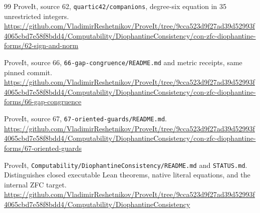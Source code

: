 \documentclass[11pt,a4paper]{article}
\theoremstyle{definition}
\newcommand{\src}[1]{{\urlstyle{tt}\nolinkurl{#1}}}
\begin{document}
\begin{thebibliography}{99}
ProveIt, source 62, \src{quartic42/companions},
degree-six equation in 35 unrestricted integers.
\url{https://github.com/VladimirReshetnikov/ProveIt/tree/9cca523d9f27ad39d52993f4065cbd7e58f8bdd4/Computability/DiophantineConsistency/con-zfc-diophantine-forms/62-sign-and-norm}

ProveIt, source 66, \src{66-gap-congruence/README.md} and
metric receipts, same pinned commit.
\url{https://github.com/VladimirReshetnikov/ProveIt/tree/9cca523d9f27ad39d52993f4065cbd7e58f8bdd4/Computability/DiophantineConsistency/con-zfc-diophantine-forms/66-gap-congruence}

ProveIt, source 67, \src{67-oriented-guards/README.md}.
\url{https://github.com/VladimirReshetnikov/ProveIt/tree/9cca523d9f27ad39d52993f4065cbd7e58f8bdd4/Computability/DiophantineConsistency/con-zfc-diophantine-forms/67-oriented-guards}

ProveIt, \src{Computability/DiophantineConsistency/README.md}
and \src{STATUS.md}. Distinguishes closed executable Lean
theorems, native literal equations, and the internal ZFC target.
\url{https://github.com/VladimirReshetnikov/ProveIt/tree/9cca523d9f27ad39d52993f4065cbd7e58f8bdd4/Computability/DiophantineConsistency}
\end{thebibliography}
\end{document}
